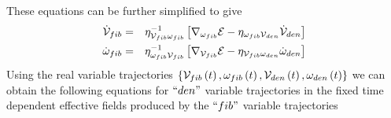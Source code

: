 These equations can be further simplified to give 
\begin{eqnarray}
{\cal \dot{V}}_{fib} &=&\eta _{{\cal V}_{fib}\omega _{fib}}^{-1}\left[
\nabla _{\omega _{fib}}{\cal E}-\eta _{{\cal \omega }_{fib}{\cal V}_{den}}%
{\cal \dot{V}}_{den}\right]  \nonumber \\
\dot{\omega}_{fib} &=&\eta _{\omega _{fib}{\cal V}_{fib}}^{-1}\left[ \nabla
_{{\cal V}_{fib}}{\cal E}-\eta _{{\cal V}_{fib}{\cal \omega }_{den}}\dot{%
\omega}_{den}\right]  \label{FEOM}
\end{eqnarray}%
Using the real variable trajectories $\left\{ {\cal V}_{fib}\left( t\right)
,\omega _{fib}\left( t\right) ,{\cal V}_{den}\left( t\right) ,\omega
_{den}\left( t\right) \right\} $ we can obtain the following equations for $%
``den"$ variable trajectories in the fixed time dependent effective fields
produced by the $``fib"$ variable trajectories 
